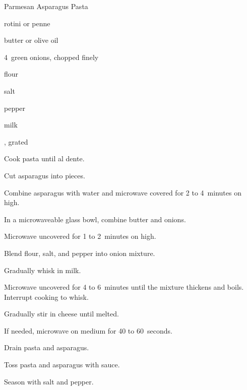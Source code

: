 \begin{recipe}{Parmesan Asparagus Pasta}{}{}

\begin{ingredients}
\item {} rotini or penne
\item \lbs{\half} 
\item {} butter or olive oil
\item 4~green onions, chopped finely
\item {} flour
\item salt
\item pepper
\item \C{1\half} milk
\item {} , grated
\end{ingredients}

\begin{directions}
\item Cook pasta until al dente.
\item Cut asparagus into \inch{\half} pieces.
\item Combine asparagus with  water and microwave covered for 2 to 4~minutes on high.
\item In a  microwaveable glass bowl, combine butter and onions.
\item Microwave uncovered for 1 to 2~minutes on high.
\item Blend flour, salt, and pepper into onion mixture.
\item Gradually whisk in milk.
\item Microwave uncovered for 4 to 6~minutes until the mixture thickens and boils. Interrupt cooking to whisk.
\item Gradually stir in cheese until melted.
\item If needed, microwave on medium for 40 to 60~seconds.
\item Drain pasta and asparagus.
\item Toss pasta and asparagus with sauce.
\item Season with salt and pepper.
\end{directions}

\end{recipe}
